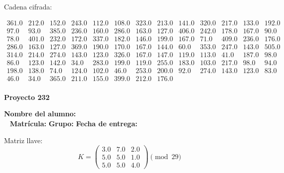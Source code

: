 \documentclass[12pt]{article}
\begin{document}
Cadena cifrada:
\begin{center}
$\begin{array}{lllllllllllll}
361.0 & 212.0 & 152.0 & 243.0 & 112.0 & 108.0 & 323.0 & 213.0 & 141.0 & 320.0 & 217.0 & 133.0 & 192.0\\
97.0 & 93.0 & 385.0 & 236.0 & 160.0 & 286.0 & 163.0 & 127.0 & 406.0 & 242.0 & 178.0 & 167.0 & 90.0\\
78.0 & 401.0 & 232.0 & 172.0 & 337.0 & 182.0 & 146.0 & 199.0 & 167.0 & 71.0 & 409.0 & 236.0 & 176.0\\
286.0 & 163.0 & 127.0 & 369.0 & 190.0 & 170.0 & 167.0 & 144.0 & 60.0 & 353.0 & 247.0 & 143.0 & 505.0\\
314.0 & 214.0 & 274.0 & 143.0 & 123.0 & 326.0 & 167.0 & 147.0 & 119.0 & 113.0 & 41.0 & 187.0 & 98.0\\
86.0 & 123.0 & 142.0 & 34.0 & 283.0 & 199.0 & 119.0 & 255.0 & 183.0 & 103.0 & 217.0 & 98.0 & 94.0\\
198.0 & 138.0 & 74.0 & 124.0 & 102.0 & 46.0 & 253.0 & 200.0 & 92.0 & 274.0 & 143.0 & 123.0 & 83.0\\
46.0 & 34.0 & 365.0 & 211.0 & 155.0 & 399.0 & 212.0 & 176.0\\
\end{array}$
\end{center}

\newpage


\textbf{Proyecto 232}

\textbf{Nombre del alumno:} \underline{\hspace{13cm}}\\\
\vspace{1cm}
\textbf{Matrícula:} \underline{\hspace{4cm}} \hspace{1cm}
\textbf{Grupo:} \underline{\hspace{2cm}}
\textbf{Fecha de entrega:} \underline{\hspace{2cm}}

\medskip

Matriz llave:
\[
K = \begin{pmatrix}
3.0 & 7.0 & 2.0\\
5.0 & 5.0 & 1.0\\
5.0 & 5.0 & 4.0
\end{pmatrix} \pmod{29}
\]
\end{document}
